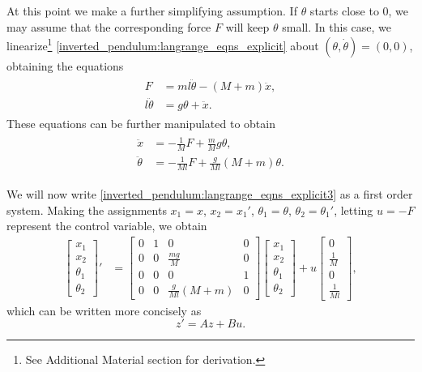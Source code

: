 At this point we make a further simplifying assumption.
If $\theta$ starts close to $0$, we may assume that the corresponding force $F$ will keep $\theta$ small.
In this case, we linearize\footnote{See Additional Material section for derivation.} \eqref{inverted_pendulum:langrange_eqns_explicit} about $(\theta, \dot{\theta}) = (0,0)$, obtaining the equations
\begin{align*}
	\begin{split}
		F &= ml\ddot{\theta} - (M + m)\ddot{x},\\
		l \ddot{\theta} &= g \theta + \ddot{x}.
	\end{split}%
\end{align*}
These equations can be further manipulated
to obtain
\begin{align}
	\begin{split}
		\ddot{x} &=  - \frac{1}{M}F + \frac{m}{M}g\theta,\\
		\ddot{\theta} &= -\frac{1}{Ml}F + \frac{g}{Ml} (M+m) \theta.
	\end{split}\label{inverted_pendulum:langrange_eqns_explicit3}
\end{align}

We will now write \eqref{inverted_pendulum:langrange_eqns_explicit3} as a first order system.
Making the assignments $x_1 = x$, $x_2 = x_1'$, $\theta_1 = \theta$, $\theta_2 = \theta_1'$, letting $u = -F$ represent the control variable, we obtain
\begin{align*}
\begin{bmatrix}
x_1\\
x_2 \\
\theta_1 \\
\theta_2
\end{bmatrix}' &=
\begin{bmatrix}
0 & 1 & 0 & 0\\
0 & 0 & \frac{mg}{M} & 0 \\
0 & 0 & 0 & 1 \\
0 & 0 & \frac{g}{Ml}(M+m) & 0
\end{bmatrix}
\begin{bmatrix}
x_1\\
x_2 \\
\theta_1 \\
\theta_2
\end{bmatrix} + u
\begin{bmatrix}
0\\
\frac{1}{M} \\
0 \\
\frac{1}{Ml}
\end{bmatrix},
\end{align*}
which can be written more concisely as
\[z' = Az + Bu.\]

